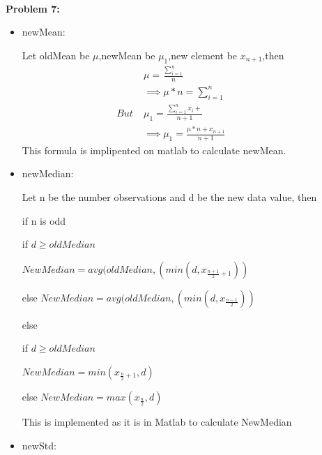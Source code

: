 \documentclass[a4paper]{article}
\begin{document}
\hrulefill \\
\textbf{Problem 7:}
\begin{itemize}
\item newMean:

\qquad Let oldMean be $\mu$,newMean be $\mu_1$,new element be $x_{n+1}$,then
\begin{equation*}
\begin{split}
&\mu=\frac{\sum_{i=1}^{n}}{n} \qquad \qquad \qquad \qquad \\
&\implies \mu*n=\sum_{i=1}^{n}\\
But \; &\mu_1=\frac{\sum_{i=1}^{n}x_i+}{n+1}\\
& \implies \mu_1=\frac{\mu*n+x_{n+1}}{n+1}
\end{split}
\end{equation*} 
\qquad This formula is implipented on matlab to calculate newMean.
\item newMedian:

\qquad Let n be the number observations and d be the new data value, then

\qquad \qquad if n is odd 

\qquad \qquad \qquad if $d \geq oldMedian$

\qquad \qquad \qquad \qquad $NewMedian=avg(oldMedian,(min(d,x_{\frac{n+1}{2}+1}))$

\qquad \qquad \qquad else $NewMedian=avg(oldMedian,(min(d,x_{\frac{n-1}{2}}))$

\qquad \qquad else

\qquad \qquad\qquad if $ d\geq oldMedian$

\qquad \qquad\qquad \qquad $NewMedian=min(x_{\frac{n}{2}+1},d)$

\qquad \qquad\qquad else $NewMedian=max(x_{\frac{n}{2}},d)$

\qquad This is implemented as it is in Matlab to calculate NewMedian
\item newStd:


\end{itemize}
\end{document}
